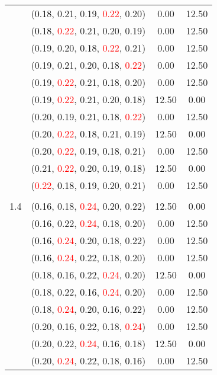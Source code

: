 \documentclass[10pt,a4paper]{report}
\begin{document}
\begin{center}
\begin{longtable}{clcc}
			&(\textcolor{black}{0.18}, 0.21, 0.19, \textcolor{red}{0.22}, 0.20)&0.00&12.50\\
			&(\textcolor{black}{0.18}, \textcolor{red}{0.22}, 0.21, 0.20, 0.19)&0.00&12.50\\
			&(0.19, 0.20, \textcolor{black}{0.18}, \textcolor{red}{0.22}, 0.21)&0.00&12.50\\
			&(0.19, 0.21, 0.20, \textcolor{black}{0.18}, \textcolor{red}{0.22})&0.00&12.50\\
			&(0.19, \textcolor{red}{0.22}, 0.21, \textcolor{black}{0.18}, 0.20)&0.00&12.50\\
			&(0.19, \textcolor{red}{0.22}, 0.21, 0.20, \textcolor{black}{0.18})&12.50&0.00\\
			&(0.20, 0.19, 0.21, \textcolor{black}{0.18}, \textcolor{red}{0.22})&0.00&12.50\\
			&(0.20, \textcolor{red}{0.22}, \textcolor{black}{0.18}, 0.21, 0.19)&12.50&0.00\\
			&(0.20, \textcolor{red}{0.22}, 0.19, \textcolor{black}{0.18}, 0.21)&0.00&12.50\\
			&(0.21, \textcolor{red}{0.22}, 0.20, 0.19, \textcolor{black}{0.18})&12.50&0.00\\
			&(\textcolor{red}{0.22}, \textcolor{black}{0.18}, 0.19, 0.20, 0.21)&0.00&12.50\\
		&&&\\
		1.4			&(\textcolor{black}{0.16}, 0.18, \textcolor{red}{0.24}, 0.20, 0.22)&12.50&0.00\\
			&(\textcolor{black}{0.16}, 0.22, \textcolor{red}{0.24}, 0.18, 0.20)&0.00&12.50\\
			&(\textcolor{black}{0.16}, \textcolor{red}{0.24}, 0.20, 0.18, 0.22)&0.00&12.50\\
			&(\textcolor{black}{0.16}, \textcolor{red}{0.24}, 0.22, 0.18, 0.20)&0.00&12.50\\
			&(0.18, \textcolor{black}{0.16}, 0.22, \textcolor{red}{0.24}, 0.20)&12.50&0.00\\
			&(0.18, 0.22, \textcolor{black}{0.16}, \textcolor{red}{0.24}, 0.20)&0.00&12.50\\
			&(0.18, \textcolor{red}{0.24}, 0.20, \textcolor{black}{0.16}, 0.22)&0.00&12.50\\
			&(0.20, \textcolor{black}{0.16}, 0.22, 0.18, \textcolor{red}{0.24})&0.00&12.50\\
			&(0.20, 0.22, \textcolor{red}{0.24}, \textcolor{black}{0.16}, 0.18)&12.50&0.00\\
			&(0.20, \textcolor{red}{0.24}, 0.22, 0.18, \textcolor{black}{0.16})&0.00&12.50\\

\end{longtable}
\end{center}
\end{document}

